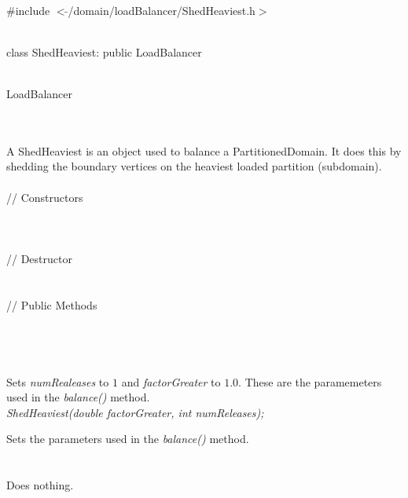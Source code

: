 
   \\
\#include $<\tilde{ }$/domain/loadBalancer/ShedHeaviest.h$>$  


  \\
class ShedHeaviest: public LoadBalancer 


 \\
 LoadBalancer 

\indent{} \\


  \\
\indent A ShedHeaviest is an object used to balance a
PartitionedDomain. It does this by shedding the boundary vertices on
the heaviest loaded partition (subdomain). \\

  \\
\indent\indent  // Constructors  \\
\indent{}\\ 
\indent{} \\ \\
\indent\indent // Destructor  \\
\indent{}  \\ \\
\indent\indent // Public Methods  \\
\indent{} \\ \\


\\
\\ 
Sets {\em numRealeases} to $1$ and  {\em factorGreater} to
$1.0$. These are the paramemeters used in the {\em balance()}
method. \\ 

{\em ShedHeaviest(double factorGreater, int numReleases);} 

Sets the parameters used in the {\em balance()} method. \\

 \\
  \\ 
Does nothing. \\

